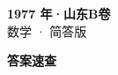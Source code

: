 \documentclass[zihao=-4, a4paper]{ctexart}
\begin{document}
\begin{center}
  {\Large\bfseries 1977 年·山东B卷}\\[4pt]
  {\large 数学 · 简答版}
\end{center}
\medskip
{}

\clearpage
{}
\begin{center}{\Large\bfseries 答案速查}\end{center}
\medskip

\end{document}
